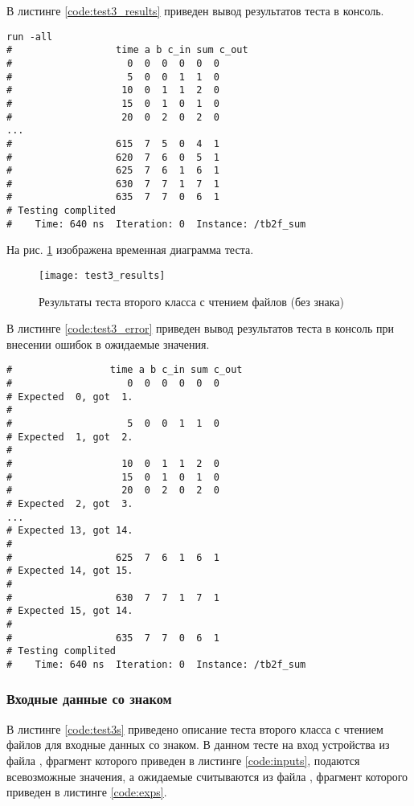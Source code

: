 В листинге \ref{code:test3_results} приведен вывод результатов теста в консоль.
\begin{lstlisting}[caption=Результаты теста второго класса с чтением файлов (без знака), label=code:test3_results, style=console]
run -all
# 		           time a b c_in sum c_out
#                    0  0  0  0  0  0
#                    5  0  0  1  1  0
#                   10  0  1  1  2  0
#                   15  0  1  0  1  0
#                   20  0  2  0  2  0
...
#                  615  7  5  0  4  1
#                  620  7  6  0  5  1
#                  625  7  6  1  6  1
#                  630  7  7  1  7  1
#                  635  7  7  0  6  1
# Testing complited
#    Time: 640 ns  Iteration: 0  Instance: /tb2f_sum
\end{lstlisting}

На рис. \ref{fig:test3_results} изображена временная диаграмма теста.
\begin{figure}[H]
	\begin{center}
		\texttt{[image: test3\_results]}
		\caption{Результаты теста второго класса с чтением файлов (без знака)}
		\label{fig:test3_results}
	\end{center}
\end{figure}

В листинге \ref{code:test3_error} приведен вывод результатов теста в консоль при внесении ошибок в ожидаемые значения.
\newpage
\begin{lstlisting}[caption=Результаты ошибочного теста второго класса с чтением файлов, label=code:test3_error, style=console]
# 		          time a b c_in sum c_out
#                    0  0  0  0  0  0
# Expected  0, got  1.
# 
#                    5  0  0  1  1  0
# Expected  1, got  2.
# 
#                   10  0  1  1  2  0
#                   15  0  1  0  1  0
#                   20  0  2  0  2  0
# Expected  2, got  3.
...
# Expected 13, got 14.
# 
#                  625  7  6  1  6  1
# Expected 14, got 15.
# 
#                  630  7  7  1  7  1
# Expected 15, got 14.
# 
#                  635  7  7  0  6  1
# Testing complited
#    Time: 640 ns  Iteration: 0  Instance: /tb2f_sum
\end{lstlisting}

\subsubsection{Входные данные со знаком}

В листинге \ref{code:test3s} приведено описание теста второго класса с чтением файлов для входные данных со знаком. В данном тесте на вход устройства из файла , фрагмент которого приведен в листинге \ref{code:inputs}, подаются всевозможные значения, а ожидаемые считываются из файла , фрагмент которого приведен в листинге \ref{code:exps}.


